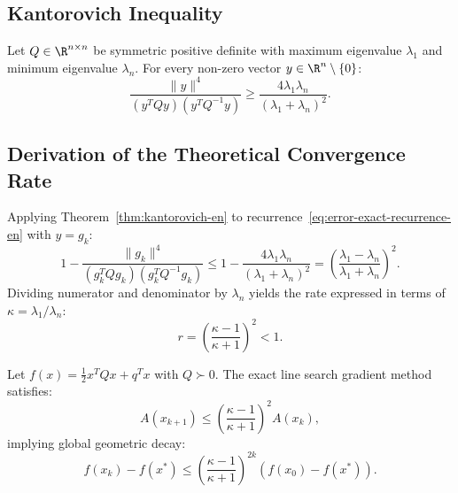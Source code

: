 \subsection{Kantorovich Inequality}

\begin{theorem}
\label{thm:kantorovich-en}
Let $Q \in \R^{n \times n}$ be symmetric positive definite with maximum eigenvalue $\lambda_1$ and minimum eigenvalue $\lambda_n$. For every non-zero vector $y \in \R^n \setminus \{0\}$:
\begin{equation}
    \frac{\|y\|^4}{(y^T Q y)(y^T Q^{-1} y)} \ge \frac{4 \lambda_1 \lambda_n}{(\lambda_1 + \lambda_n)^2}.
    \label{eq:kantorovich-inequality-en}
\end{equation}
\end{theorem}

\subsection{Derivation of the Theoretical Convergence Rate}
Applying Theorem~\ref{thm:kantorovich-en} to recurrence~\eqref{eq:error-exact-recurrence-en} with $y = g_k$:
\begin{equation}
    1 - \frac{\|g_k\|^4}{(g_k^T Q g_k)(g_k^T Q^{-1} g_k)} \le 1 - \frac{4 \lambda_1 \lambda_n}{(\lambda_1 + \lambda_n)^2} = \left( \frac{\lambda_1 - \lambda_n}{\lambda_1 + \lambda_n} \right)^2.
\end{equation}
Dividing numerator and denominator by $\lambda_n$ yields the rate expressed in terms of $\kappa = \lambda_1 / \lambda_n$:
\begin{equation}
    r = \left( \frac{\kappa - 1}{\kappa + 1} \right)^2 < 1.
    \label{eq:kantorovich-rate-en}
\end{equation}

\begin{theorem}
Let $f(x) = \frac{1}{2} x^T Q x + q^T x$ with $Q \succ 0$. The exact line search gradient method satisfies:
\begin{equation}
    A(x_{k+1}) \le \left( \frac{\kappa - 1}{\kappa + 1} \right)^2 A(x_k),
\end{equation}
implying global geometric decay:
\begin{equation}
    f(x_k) - f(x^*) \le \left( \frac{\kappa - 1}{\kappa + 1} \right)^{2k} (f(x_0) - f(x^*)).
\end{equation}
\end{theorem}

